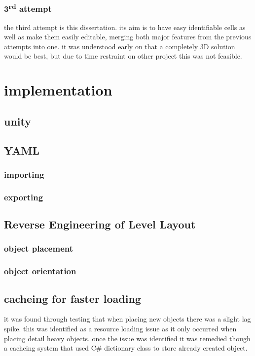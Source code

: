\subsubsection{3\textsuperscript{rd} attempt}
the third attempt is this dissertation. its aim is to have easy identifiable cells as well as make them easily editable, merging both major features from the previous attempts into one. it was understood early on that a completely 3D solution would be best, but due to time restraint on other project this was not feasible.

\section{implementation}
\subsection{unity}

\subsection{YAML}
\subsubsection{importing}
\subsubsection{exporting}

\subsection{Reverse Engineering of Level Layout}
\subsubsection{object placement}
\subsubsection{object orientation}

\subsection{cacheing for faster loading}
it was found through testing that when placing new objects there was a slight lag spike. this was identified as a resource loading issue as it only occurred when placing detail heavy objects. once the issue was identified it was remedied though a cacheing system that used C\# dictionary class to store already created object.

